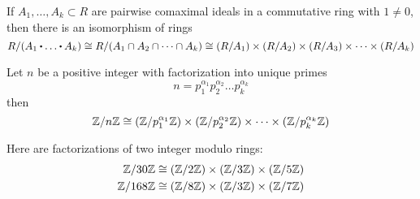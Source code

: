\documentclass[../Main.tex]{subfiles}
\begin{document}
\begin{crl}
	If $A_1,\dots,A_k\subset R$ are pairwise comaximal ideals in a commutative ring with $1\ne 0$, then there is an isomorphism of rings
	\[R/(A_1\rdot \dots\rdot A_k)\cong R/(A_1\cap A_2\cap \dots \cap A_k) \cong (R/A_1)\times (R/A_2)\times (R/A_3)\times\dots\times(R/A_k)\]
\end{crl}
\begin{crl}
	Let $n$ be a positive integer with factorization into unique primes \[n=p_1^{\alpha_1} p_2^{\alpha_2}\dots p_k^{\alpha_k}\]
	then
	\[\mathbb{Z}/n\mathbb{Z} \cong (\mathbb{Z}/p_1^{\alpha_1}\mathbb{Z})\times (\mathbb{Z}/p_2^{\alpha_2}\mathbb{Z})\times \dots \times (\mathbb{Z}/p_k^{\alpha_k}\mathbb{Z})\]
\end{crl}
\begin{example} Here are factorizations of two integer modulo rings:
	\begin{align*}
	\mathbb{Z}/30\mathbb{Z}&\cong (\mathbb{Z}/2\mathbb{Z})\times(\mathbb{Z}/3\mathbb{Z})\times(\mathbb{Z}/5\mathbb{Z})\\
	\mathbb{Z}/168\mathbb{Z}&\cong (\mathbb{Z}/8\mathbb{Z})\times(\mathbb{Z}/3\mathbb{Z})\times(\mathbb{Z}/7\mathbb{Z})
	\end{align*}
\end{example}
\end{document}
